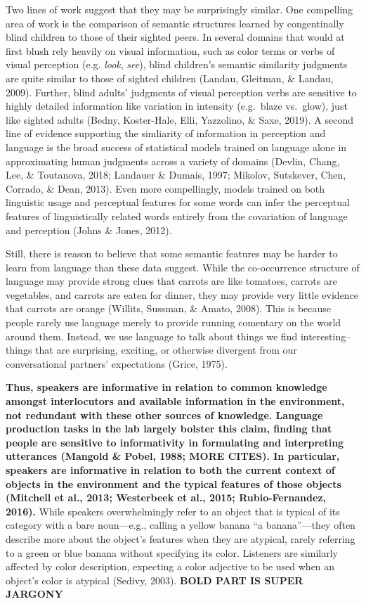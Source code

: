 \documentclass[10pt, letterpaper]{article}
\begin{document}
Two lines of work suggest that they may be surprisingly similar. One
compelling area of work is the comparison of semantic structures learned
by congentinally blind children to those of their sighted peers. In
several domains that would at first blush rely heavily on visual
information, such as color terms or verbs of visual perception (e.g.
\emph{look}, \emph{see}), blind children's semantic similarity judgments
are quite similar to those of sighted children (Landau, Gleitman, \&
Landau, 2009). Further, blind adults' judgments of visual perception
verbs are sensitive to highly detailed information like variation in
intensity (e.g.~blaze vs.~glow), just like sighted adults (Bedny,
Koster-Hale, Elli, Yazzolino, \& Saxe, 2019). A second line of evidence
supporting the simliarity of information in perception and language is
the broad success of statistical models trained on language alone in
approximating human judgments across a variety of domains (Devlin,
Chang, Lee, \& Toutanova, 2018; Landauer \& Dumais, 1997; Mikolov,
Sutskever, Chen, Corrado, \& Dean, 2013). Even more compellingly, models
trained on both linguistic usage and perceptual features for some words
can infer the perceptual features of linguistically related words
entirely from the covariation of language and perception (Johns \&
Jones, 2012).

Still, there is reason to believe that some semantic features may be
harder to learn from language than these data suggest. While the
co-occurrence structure of language may provide strong clues that
carrots are like tomatoes, carrots are vegetables, and carrots are eaten
for dinner, they may provide very little evidence that carrots are
orange (Willits, Sussman, \& Amato, 2008). This is because people rarely
use language merely to provide running comentary on the world around
them. Instead, we use language to talk about things we find
interesting--things that are surprising, exciting, or otherwise
divergent from our conversational partners' expectations (Grice, 1975).

\textbf{Thus, speakers are informative in relation to common knowledge
amongst interlocutors and available information in the environment, not
redundant with these other sources of knowledge. Language production
tasks in the lab largely bolster this claim, finding that people are
sensitive to informativity in formulating and interpreting utterances
(Mangold \& Pobel, 1988; MORE CITES). In particular, speakers are
informative in relation to both the current context of objects in the
environment and the typical features of those objects (Mitchell et al.,
2013; Westerbeek et al., 2015; Rubio-Fernandez, 2016).} While speakers
overwhelmingly refer to an object that is typical of its category with a
bare noun---e.g., calling a yellow banana ``a banana''---they often
describe more about the object's features when they are atypical, rarely
referring to a green or blue banana without specifying its color.
Listeners are similarly affected by color description, expecting a color
adjective to be used when an object's color is atypical (Sedivy, 2003).
\textbf{BOLD PART IS SUPER JARGONY}
\end{document}
